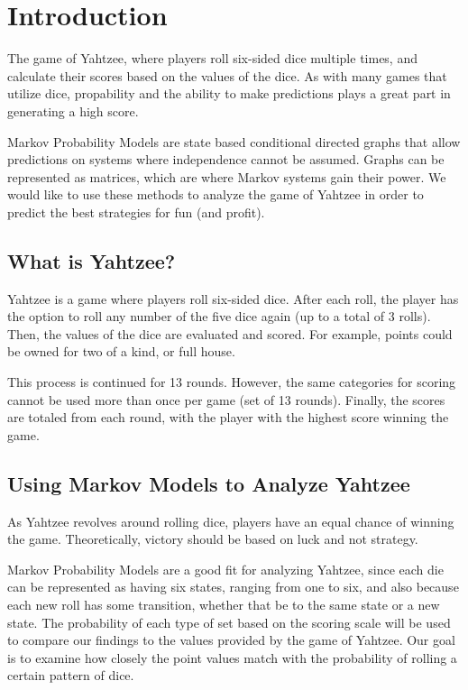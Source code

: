 \section{Introduction}

The game of Yahtzee, where players roll six-sided dice multiple times, and
calculate their scores based on the values of the dice. As with many games
that utilize dice, propability and the ability to make predictions plays a great
part in generating a high score.

Markov Probability Models are state based conditional directed graphs that
allow predictions on systems where independence cannot be assumed. Graphs can
be represented as matrices, which are where Markov systems gain their power.
We would like to use these methods to analyze the game of Yahtzee in order to
predict the best strategies for fun (and profit).

\subsection{What is Yahtzee?}

Yahtzee is a game where players roll six-sided dice. After each roll, the
player has the option to roll any number of the five dice again (up to a total
of 3 rolls). Then, the values of the dice are evaluated and scored. For example,
points could be owned for two of a kind, or full house.

This process is continued for 13 rounds. However, the same categories for scoring
cannot be used more than once per game (set of 13 rounds). Finally, the scores
are totaled from each round, with the player with the highest score winning the
game.

\subsection{Using Markov Models to Analyze Yahtzee}

As Yahtzee revolves around rolling dice, players have an equal chance of
winning the game. Theoretically, victory should be based on luck and not
strategy.

Markov Probability Models are a good fit for analyzing Yahtzee, since each
die can be represented as having six states, ranging from one to six, and also
because each new roll has some transition, whether that be to the same state or
a new state. The probability of each type of set based on the scoring scale will
be used to compare our findings to the values provided by the game of Yahtzee.
Our goal is to examine how closely the point values match with the probability
of rolling a certain pattern of dice.
